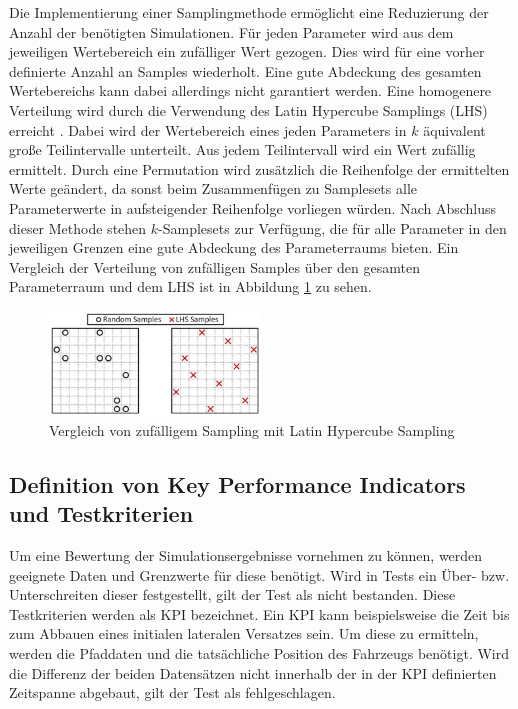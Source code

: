 Die Implementierung einer Samplingmethode ermöglicht eine Reduzierung der Anzahl der benötigten Simulationen. Für jeden Parameter wird aus dem jeweiligen Wertebereich ein zufälliger Wert gezogen. Dies wird für eine vorher definierte Anzahl an Samples wiederholt. Eine gute Abdeckung des gesamten Wertebereichs kann dabei allerdings nicht garantiert werden. Eine homogenere Verteilung wird durch die Verwendung des Latin Hypercube Samplings (LHS) erreicht \cite{McKay1979}. Dabei wird der Wertebereich eines jeden Parameters in $k$ äquivalent große Teilintervalle unterteilt. Aus jedem Teilintervall wird ein Wert zufällig ermittelt. Durch eine Permutation wird zusätzlich die Reihenfolge der ermittelten Werte geändert, da sonst beim Zusammenfügen zu Samplesets alle Parameterwerte in aufsteigender Reihenfolge vorliegen würden. Nach Abschluss dieser Methode stehen $k$-Samplesets zur Verfügung, die für alle Parameter in den jeweiligen Grenzen eine gute Abdeckung des Parameterraums bieten. Ein Vergleich der Verteilung von zufälligen Samples über den gesamten Parameterraum und dem LHS ist in Abbildung \ref{fig:Random_vs_LHS} zu sehen.
\begin{figure}[ht]
    \centering
    \includegraphics[width=0.5\textwidth]{figures/3_Implementierung/LHS_random_compare.png}
    \caption{Vergleich von zufälligem Sampling mit Latin Hypercube Sampling \cite{Preece2015}}
    \label{fig:Random_vs_LHS}
\end{figure}

\subsection{Definition von Key Performance Indicators und Testkriterien} \label{subsec:KPI}

Um eine Bewertung der Simulationsergebnisse vornehmen zu können, werden geeignete Daten und Grenzwerte für diese benötigt. Wird in Tests ein Über- bzw. Unterschreiten dieser festgestellt, gilt der Test als nicht bestanden. Diese Testkriterien werden als KPI bezeichnet. Ein KPI kann beispielsweise die Zeit bis zum Abbauen eines initialen lateralen Versatzes sein. Um diese zu ermitteln, werden die Pfaddaten und die tatsächliche Position des Fahrzeugs benötigt. Wird die Differenz der beiden Datensätzen nicht innerhalb der in der KPI definierten Zeitspanne abgebaut, gilt der Test als fehlgeschlagen.

